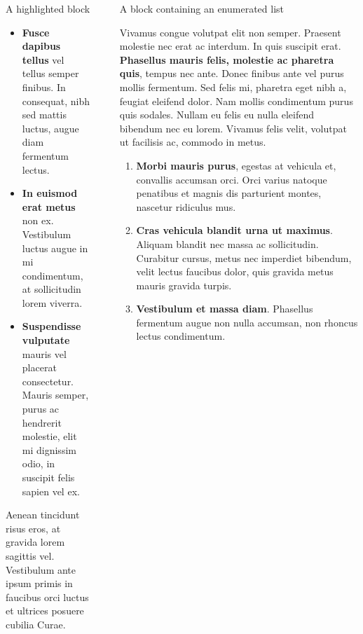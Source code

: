 \documentclass[final]{beamer}
\newlength{\sepwidth}
\newlength{\colwidth}
\newcommand{\separatorcolumn}{\begin{column}{\sepwidth}\end{column}}
\begin{document}
\begin{frame}[t]
\begin{columns}[t]
\begin{column}{\colwidth}
\begin{alertblock}{A highlighted block}
					\begin{itemize}
						\item \textbf{Fusce dapibus tellus} vel tellus semper finibus. In
						consequat, nibh sed mattis luctus, augue diam fermentum lectus.
						\item \textbf{In euismod erat metus} non ex. Vestibulum luctus augue in
						mi condimentum, at sollicitudin lorem viverra.
						\item \textbf{Suspendisse vulputate} mauris vel placerat consectetur.
						Mauris semper, purus ac hendrerit molestie, elit mi dignissim odio, in
						suscipit felis sapien vel ex.
					\end{itemize}
					
					Aenean tincidunt risus eros, at gravida lorem sagittis vel. Vestibulum ante
					ipsum primis in faucibus orci luctus et ultrices posuere cubilia Curae.
					
				\end{alertblock}
				
			\end{column}
			
			\separatorcolumn
			
			\begin{column}{\colwidth}
				
				\begin{block}{A block containing an enumerated list}
					
					Vivamus congue volutpat elit non semper. Praesent molestie nec erat ac
					interdum. In quis suscipit erat. \textbf{Phasellus mauris felis, molestie
						ac pharetra quis}, tempus nec ante. Donec finibus ante vel purus mollis
					fermentum. Sed felis mi, pharetra eget nibh a, feugiat eleifend dolor. Nam
					mollis condimentum purus quis sodales. Nullam eu felis eu nulla eleifend
					bibendum nec eu lorem. Vivamus felis velit, volutpat ut facilisis ac,
					commodo in metus.
					
					\begin{enumerate}
						\item \textbf{Morbi mauris purus}, egestas at vehicula et, convallis
						accumsan orci. Orci varius natoque penatibus et magnis dis parturient
						montes, nascetur ridiculus mus.
						\item \textbf{Cras vehicula blandit urna ut maximus}. Aliquam blandit nec
						massa ac sollicitudin. Curabitur cursus, metus nec imperdiet bibendum,
						velit lectus faucibus dolor, quis gravida metus mauris gravida turpis.
						\item \textbf{Vestibulum et massa diam}. Phasellus fermentum augue non
						nulla accumsan, non rhoncus lectus condimentum.
					\end{enumerate}
					

\end{block}
\end{column}
\end{columns}
\end{frame}
\end{document}
